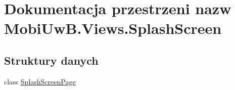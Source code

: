 \hypertarget{a00294}{}\section{Dokumentacja przestrzeni nazw Mobi\+Uw\+B.\+Views.\+Splash\+Screen}
\label{a00294}
\subsection*{Struktury danych}
\begin{DoxyCompactItemize}
\item 
class \hyperlink{a00059}{Splash\+Screen\+Page}
\end{DoxyCompactItemize}
